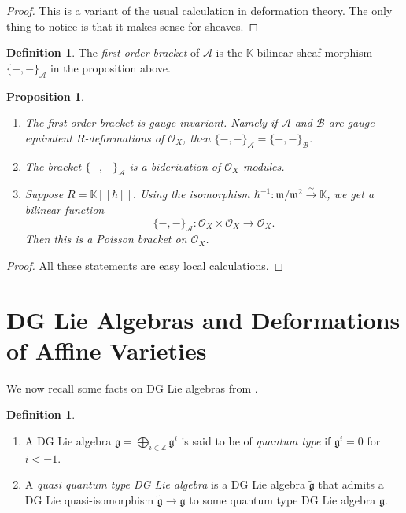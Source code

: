\documentclass[a4paper, 10pt]{amsart}
\newtheorem{prop}[equation]{Proposition}
\theoremstyle{definition}
\newtheorem{dfn}[equation]{Definition}
\numberwithin{equation}{section}
\newcommand{\iso}{\xrightarrow{\simeq}}
\newcommand{\mfrak}[1]{\mathfrak{#1}}
\newcommand{\mcal}[1]{\mathcal{#1}}
\newcommand{\mbb}[1]{\mathbb{#1}}
\newcommand{\til}[1]{\tilde{#1}}
\newcommand{\K}{\mbb{K}}
\newcommand{\g}{\mfrak{g}}
\newcommand{\m}{\mfrak{m}}
\begin{document}
\begin{proof}
This is a variant of the usual calculation in deformation theory. The
only thing to notice is that it makes sense for sheaves.
\end{proof}

\begin{dfn} \label{dfn:20}
The {\em first order bracket} of $\mcal{A}$ is the 
$\K$-bilinear sheaf morphism
$\{ -,- \}_{\mcal{A}}$ in the proposition above. 
\end{dfn}

\begin{prop} \label{prop:20}
\begin{enumerate}
\item The first order bracket is gauge invariant. Namely if 
$\mcal{A}$ and $\mcal{B}$ are gauge equivalent
$R$-deformations of $\mcal{O}_X$, then 
$\{ -,- \}_{\mcal{A}} = \{ -,- \}_{\mcal{B}}$.
%
\item The bracket $\{ -,- \}_{\mcal{A}}$ is a biderivation of
$\mcal{O}_X$-modules.
%
\item Suppose $R = \K[[\hbar]]$. Using the isomorphism
$\hbar^{-1} : \m / \m^2 \iso \K$, we get a bilinear function
\[ \{ -,- \}_{\mcal{A}} : \mcal{O}_X \times \mcal{O}_X \to \mcal{O}_X
. \]
Then this is a Poisson bracket on $\mcal{O}_X$.
\end{enumerate}
\end{prop}

\begin{proof}
All these statements are easy local calculations. 
\end{proof}








\section{DG Lie Algebras and Deformations of Affine Varieties}
\label{sec:defs-DG-Lie}

We now recall some facts on DG Lie algebras from \cite{Ye7, Ye9}. 

\begin{dfn} \label{dfn:220}
\begin{enumerate}
\item A DG Lie algebra 
$\g = \bigoplus_{i \in \mbb{Z}} \mfrak{g}^{i}$
is said to be of {\em quantum type} if $\g^i = 0$ for $i < -1$.

\item A {\em quasi quantum type DG Lie algebra} is a DG Lie algebra 
$\til{\mfrak{g}}$ that admits a DG Lie quasi-isomorphism
$\til{\g} \to \g$ to some quantum type DG Lie algebra $\g$.
\end{enumerate}
\end{dfn}
\end{document}
